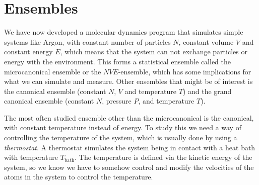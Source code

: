 \chapter{Ensembles}
%
%
%
%
We have now developed a molecular dynamics program that simulates simple systems like Argon, with constant number of particles $N$, constant volume $V$ and constant energy $E$, which means that the system can not exchange particles or energy with the environment. This forms a statistical ensemble called the microcanonical ensemble or the $NVE$-ensemble, which has some implications for what we can simulate and measure. Other ensembles that might be of interest is the canonical ensemble (constant $N$, $V$ and temperature $T$) and the grand canonical ensemble (constant $N$, pressure $P$, and temperature $T$).


The most often studied ensemble other than the microcanonical is the canonical, with constant temperature instead of energy. To study this we need a way of controlling the temperature of the system, which is usually done by using a \emph{thermostat}. A thermostat simulates the system being in contact with a heat bath with temperature $T_\text{bath}$. The temperature is defined via the kinetic energy of the system, so we know we have to somehow control and modify the velocities of the atoms in the system to control the temperature.
% 

